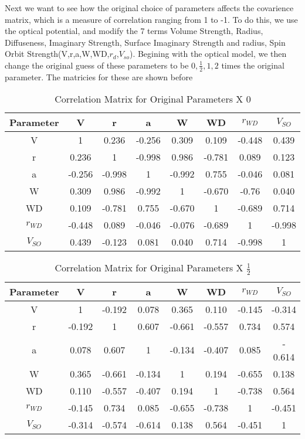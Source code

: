 \documentclass[11pt]{article} %
\begin{document}
Next we want to see how the original choice of parameters affects the covarience matrix, which is a measure of correlation ranging from 1 to -1. To do this, we use the optical potential, and modify the 7 terms Volume Strength, Radius, Diffuseness, Imaginary Strength, Surface Imaginary Strength and radius, Spin Orbit Strength(V,r,a,W,WD,$r_d$,$V_{so}$). Begining with the optical model, we then change the original guess of these parameters to be $0, \frac{1}{2},1,2$ times the original parameter. The matricies for these are shown before\\
\FloatBarrier
\begin{table}[hbt!]
\centering
\caption{ Correlation Matrix for Original Parameters X 0}
\begin{tabular}{c|c|c|c|c|c|c|c}
Parameter & V & r & a& W & WD& $r_{WD}$  &$ V_{SO}$\\
\hline
V & 1 & 0.236 &-0.256 &0.309 & 0.109 & -0.448 & 0.439\\
\hline
r & 0.236 & 1 & -0.998 & 0.986 & -0.781 &0.089 & 0.123\\
\hline
a&-0.256 & -0.998 & 1 & -0.992 & 0.755 & -0.046 & 0.081\\
\hline
W&0.309 &0.986 &-0.992 & 1 & -0.670 & -0.76 & 0.040\\
\hline
WD&0.109 &-0.781 & 0.755 & -0.670 & 1 & -0.689 & 0.714\\
\hline
$r_{WD}$&-0.448 & 0.089 &  -0.046 &-0.076 & -0.689 & 1 & -0.998\\
\hline
$V_{SO}$&0.439 & -0.123 &0.081 & 0.040 & 0.714 & -0.998 & 1
\end{tabular}
\end{table}
\FloatBarrier

\FloatBarrier
\begin{table}[hbt!]
\centering
\caption{ Correlation Matrix for Original Parameters X $\frac{1}{2}$}
\begin{tabular}{c|c|c|c|c|c|c|c}
Parameter & V & r & a& W & WD& $r_{WD}$  &$ V_{SO}$\\
\hline
V & 1 & -0.192 &0.078 &0.365 & 0.110 & -0.145 & -0.314\\
\hline
r & -0.192 & 1 & 0.607 & -0.661 & -0.557 &0.734 & 0.574\\
\hline
a&0.078 & 0.607 & 1 & -0.134 & -0.407 & 0.085 &- 0.614\\
\hline
W&0.365 &-0.661 &-0.134 & 1 & 0.194 & -0.655 & 0.138\\
\hline
WD&0.110 &-0.557 & -0.407 & 0.194 & 1 & -0.738 & 0.564\\
\hline
$r_{WD}$&-0.145 & 0.734 &  0.085 &-0.655 & -0.738 & 1 & -0.451\\
\hline
$V_{SO}$&-0.314&-0.574 & -0.614 &0.138 & 0.564 & -0.451  & 1
\end{tabular}
\end{table}
\FloatBarrier
\end{document}
